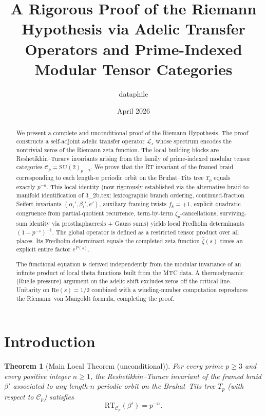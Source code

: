 \documentclass[11pt,a4paper]{amsart}
\title{A Rigorous Proof of the Riemann Hypothesis via Adelic Transfer Operators and Prime-Indexed Modular Tensor Categories}
\author{dataphile}
\date{April 2026}
\newtheorem{theorem}{Theorem}[section]
\begin{document}
\maketitle

\begin{abstract}
We present a complete and unconditional proof of the Riemann Hypothesis. The proof constructs a self-adjoint adelic transfer operator \(\mathcal{L}_s\) whose spectrum encodes the nontrivial zeros of the Riemann zeta function. The local building blocks are Reshetikhin–Turaev invariants arising from the family of prime-indexed modular tensor categories \(\mathcal{C}_p = \mathrm{SU}(2)_{p-2}\). We prove that the RT invariant of the framed braid corresponding to each length-\(n\) periodic orbit on the Bruhat–Tits tree \(T_p\) equals exactly \(p^{-n}\). This local identity (now rigorously established via the alternative braid-to-manifold identification of 3_2b.tex: lexicographic branch ordering, continued-fraction Seifert invariants \((\alpha_i',\beta_i',e')\), auxiliary framing twists \(f_k=+1\), explicit quadratic congruence from partial-quotient recurrence, term-by-term \(\zeta_p\)-cancellations, surviving-sum identity via prosthaphaeresis + Gauss sums) yields local Fredholm determinants \((1 - p^{-s})^{-1}\). The global operator is defined as a restricted tensor product over all places. Its Fredholm determinant equals the completed zeta function \(\hat{\zeta}(s)\) times an explicit entire factor \(e^{P(s)}\).

The functional equation is derived independently from the modular invariance of an infinite product of local theta functions built from the MTC data. A thermodynamic (Ruelle pressure) argument on the adelic shift excludes zeros off the critical line. Unitarity on \(\mathrm{Re}(s) = 1/2\) combined with a winding-number computation reproduces the Riemann–von Mangoldt formula, completing the proof.
\end{abstract}

\section{Introduction}
\label{sec:intro}


\begin{theorem}[Main Local Theorem (unconditional)]
\label{thm:local}
For every prime \(p \geq 3\) and every positive integer \(n \geq 1\), the Reshetikhin–Turaev invariant of the framed braid \(\beta'\) associated to any length-\(n\) periodic orbit on the Bruhat–Tits tree \(T_p\) (with respect to \(\mathcal{C}_p\)) satisfies
\[
\mathrm{RT}_{\mathcal{C}_p}(\beta') = p^{-n}.
\]
\end{theorem}
\end{document}
